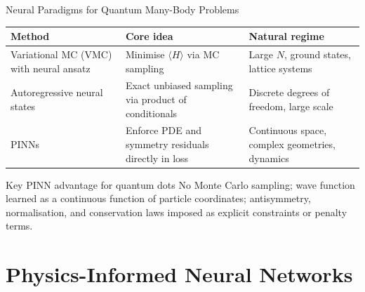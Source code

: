 \documentclass[aspectratio=169,10pt]{beamer}
\begin{document}
\begin{frame}{Neural Paradigms for Quantum Many-Body Problems}
  \renewcommand{\arraystretch}{1.35}
  \begin{tabular}{p{2.6cm}p{4.0cm}p{4.6cm}}
    \toprule
    \textbf{Method} & \textbf{Core idea} & \textbf{Natural regime} \\
    \midrule
    Variational MC (VMC) with neural ansatz &
      Minimise $\langle H\rangle$ via MC sampling &
      Large $N$, ground states, lattice systems \\
    Autoregressive neural states &
      Exact unbiased sampling via product of conditionals &
      Discrete degrees of freedom, large scale \\
    \alert{PINNs} &
      Enforce PDE and symmetry residuals directly in loss &
      Continuous space, complex geometries, dynamics \\
    \bottomrule
  \end{tabular}

  \vspace{0.5cm}
  \begin{alertblock}{Key PINN advantage for quantum dots}
    No Monte Carlo sampling; wave function learned as a continuous function
    of particle coordinates; antisymmetry, normalisation, and conservation
    laws imposed as explicit constraints or penalty terms.
  \end{alertblock}
\end{frame}

\section{Physics-Informed Neural Networks}
\end{document}
